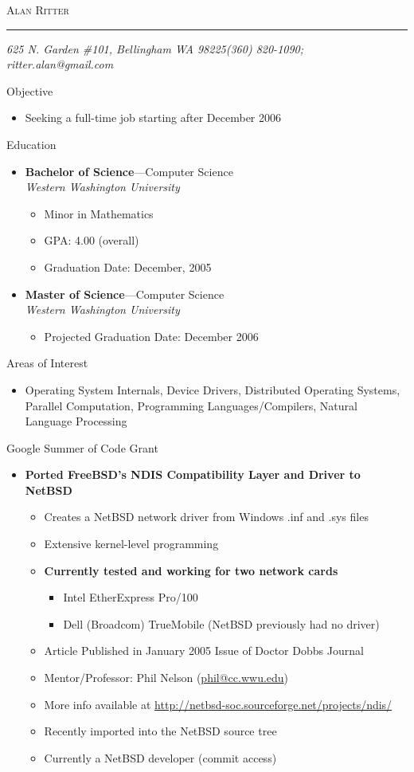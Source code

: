 \documentclass[11pt,oneside]{article}
\makeatletter
\newcommand{\name}{Alan Ritter}
\newcommand{\addr}{625 N. Garden \#101, Bellingham WA 98225}
\newcommand{\phone}{(360) 820-1090}
\newcommand{\email}{ritter.alan@gmail.com}
\newcommand{\bigname}[1]{
	\begin{center}\fontfamily{phv}\selectfont\Huge\scshape#1\end{center}
}
\newenvironment{ressection}[1]{
	\vspace{4pt}
	{\fontfamily{phv}\selectfont\Large#1}
	\begin{itemize}
	\vspace{3pt}
}{
	\end{itemize}
}
\newcommand{\resitem}[1]{
	\vspace{-4pt}
	\item \begin{flushleft} #1 \end{flushleft}
}
\newcommand{\ressubitem}[1]{
	\vspace{-1pt}
	\item \begin{flushleft} #1 \end{flushleft}
}
\newcommand{\resbigitem}[3]{
	\vspace{-5pt}
	\item
	\textbf{#1}---#2 \\
	\textit{#3}
}
\newenvironment{ressubsec}[3]{
	\resbigitem{#1}{#2}{#3}
	\vspace{-2pt}
	\begin{itemize}
}{
	\end{itemize}
}
\newenvironment{reslist}[1]{
	\resitem{\textbf{#1}}
	\begin{itemize}
}{
	\end{itemize}
}
\makeatother
\begin{document}
 \selectfont

\bigname{\name}

\vspace{-8pt} \rule{\textwidth}{1pt}

\vspace{-1pt} {\small\itshape \addr \hfill \phone; \email}

\vspace{8 pt}


\begin{ressection}{Objective}
  \ressubitem{Seeking a full-time job starting after December 2006}
\end{ressection}

\begin{ressection}{Education}

  \begin{ressubsec}{Bachelor of Science}{Computer Science}{Western Washington University}
    \ressubitem{Minor in Mathematics}
    \ressubitem{GPA: 4.00 (overall)}
    \ressubitem{Graduation Date: December, 2005}
  \end{ressubsec}

  \begin{ressubsec}{Master of Science}{Computer Science}{Western Washington University}
    \ressubitem{Projected Graduation Date: December 2006}
  \end{ressubsec}

\end{ressection}

\begin{ressection}{Areas of Interest}
  \ressubitem{Operating System Internals, Device Drivers, Distributed Operating Systems, Parallel Computation, Programming Languages/Compilers, Natural Language Processing}
\end{ressection}

\begin{ressection}{Google Summer of Code Grant}
  \begin{reslist}{Ported FreeBSD's NDIS Compatibility Layer and Driver to NetBSD}
    \ressubitem{Creates a NetBSD network driver from Windows .inf and .sys files}
    \ressubitem{Extensive kernel-level programming}
    \begin{reslist}{Currently tested and working for two network cards}
      \ressubitem{Intel EtherExpress Pro/100}
      \ressubitem{Dell (Broadcom) TrueMobile (NetBSD previously had no driver)}
    \end{reslist}
    \ressubitem{Article Published in January 2005 Issue of Doctor Dobbs Journal}
    \ressubitem{Mentor/Professor: Phil Nelson (\url{phil@cc.wwu.edu})}
    \ressubitem{More info available at \url{http://netbsd-soc.sourceforge.net/projects/ndis/}}
    \ressubitem{Recently imported into the NetBSD source tree}
    \ressubitem{Currently a NetBSD developer (commit access)}
  \end{reslist}
\end{ressection}
\end{document}
